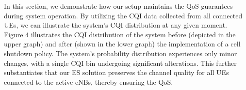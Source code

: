 In this section, we demonstrate how our setup maintains the QoS guarantees during system operation.
By utilizing the CQI data collected from all connected UEs, we can illustrate the system's CQI distribution at any given moment.
\hyperref[fig:r2]{Figure 4} illustrates the CQI distribution of the system before (depicted in the upper graph) and after (shown in the lower graph) the implementation of a cell shutdown policy.
The system's probability distribution experiences only minor changes, with a single CQI bin undergoing significant alterations.
This further substantiates that our ES solution preserves the channel quality for all UEs connected to the active eNBs, thereby ensuring the QoS.